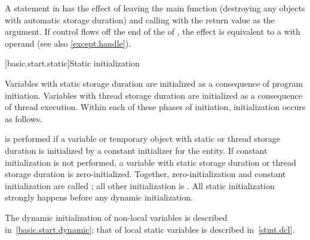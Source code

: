 \pnum
{}%
%
A  statement in  has the effect of leaving the main
function (destroying any objects with automatic storage duration) and
calling  with the return value as the argument.
If control flows off the end of
the  of ,
the effect is equivalent to a  with operand 
(see also \ref{except.handle}).

[basic.start.static]{Static initialization}

\pnum
{}%
%
Variables with static storage duration
are initialized as a consequence of program initiation. Variables with
thread storage duration are initialized as a consequence of thread execution.
Within each of these phases of initiation, initialization occurs as follows.

\pnum
{}%
%
 is performed
if a variable or temporary object with static or thread storage duration
is initialized by a constant initializer for the entity.
%
If constant initialization is not performed, a variable with static
storage duration or thread storage
duration is zero-initialized.
Together, zero-initialization and constant initialization are called
%
;
all other initialization is .
All static initialization strongly happens before
any dynamic initialization.
\begin{note} The dynamic initialization of non-local variables is described
in~\ref{basic.start.dynamic}; that of local static variables is described
in~\ref{stmt.dcl}. \end{note}

